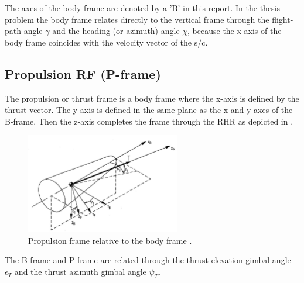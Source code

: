 The axes of the body frame are denoted by a 'B' in this report. In the thesis problem the body frame relates directly to the vertical frame through the flight-path angle $\gamma$ and the heading (or azimuth) angle $\chi$, because the x-axis of the body frame coincides with the velocity vector of the \ac{s/c}. 



\subsection{Propulsion \ac{RF} (P-frame)}
\label{subsec:propframe}
The propulsion or thrust frame is a body frame where the x-axis is defined by the thrust vector. The y-axis is defined in the same plane as the x and y-axes of the B-frame. Then the z-axis completes the frame through the \ac{RHR} as depicted in .

\begin{figure}[!ht]
\centering
\includegraphics[width=0.6\textwidth]{figures/reference_frames/propframe_mooij1994motion.jpg}
\caption{Propulsion frame relative to the body frame \citep{mooij1994motion}.}
\label{fig:propframe_mooij1994motion}
\end{figure}

The B-frame and P-frame are related through the thrust elevation gimbal angle $\epsilon_{T}$ and the thrust azimuth gimbal angle $\psi_{T}$. 

